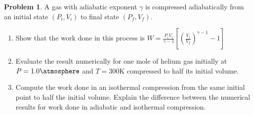 \documentclass[10pt]{article}
\theoremstyle{definition}
\newtheorem{problem}{Problem}
\begin{document}
\begin{problem}
A gas with adiabatic exponent $\gamma$ is compressed adiabatically from an initial state $(P_i, V_i)$ to final state $(P_f, V_f)$.
\begin{enumerate}[label=(\alph*)]
  \item Show that the work done in this process is $W=\displaystyle\frac{P_iV_i}{\gamma-1}\left[\left(\frac{V_i}{V_f}\right)^{\gamma-1}-1\right]$
  \item Evaluate the result numerically for one mole of helium gas initially at $P=1.0\unit{\atmosphere}$ and $T=300\unit{\kelvin}$ compressed to half its initial volume.
  \item Compute the work done in an isothermal compression from the same initial point to half the initial volume.
        Explain the difference between the numerical results for work done in adiabatic and isothermal compression.
\end{enumerate}
\end{problem}
\end{document}
